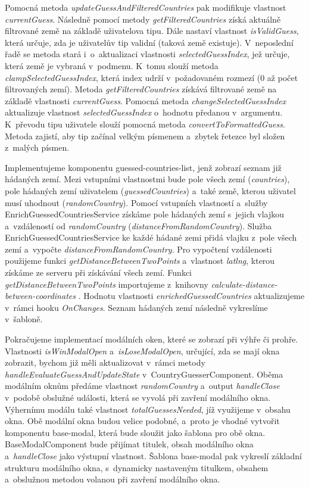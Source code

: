 Pomocná metoda \emph{updateGuessAndFilteredCountries} pak modifikuje vlastnost \emph{currentGuess}. 
Následně pomocí metody \emph{getFilteredCountries} získá aktuálně filtrované země na základě uživatelova tipu. 
Dále nastaví vlastnost \emph{isValidGuess}, která určuje, zda je uživatelův tip validní (taková země existuje). 
V~neposlední řadě se metoda stará i~o~aktualizaci vlastnosti \emph{selectedGuessIndex}, jež určuje, která země je vybraná v~podmenu. 
K~tomu slouží metoda \emph{clampSelectedGuessIndex}, která index udrží v~požadovaném rozmezí (0 až počet filtrovaných zemí).
Metoda \emph{getFilteredCountries} získává filtrované země na základě vlastnosti \emph{currentGuess}. 
Pomocná metoda \emph{changeSelectedGuessIndex} aktualizuje vlastnost \emph{selectedGuessIndex} o~hodnotu předanou v~argumentu. 
K~převodu tipu uživatele slouží pomocná metoda \emph{convertToFormattedGuess}. Metoda zajistí, aby tip začínal velkým písmenem a~zbytek řetezce byl složen z~malých písmen.

Implementujeme komponentu guessed-countries-list, jenž zobrazí seznam již hádaných zemí. 
Mezi vstupními vlastnostmi bude pole všech zemí (\emph{countries}), pole hádaných zemí uživatelem (\emph{guessedCountries}) a~také země, kterou uživatel musí uhodnout (\emph{randomCountry}).
Pomocí vstupních vlastností a~služby EnrichGuessedCountriesService získáme pole hádaných zemí s~jejich vlajkou a~vzdáleností od \emph{randomCountry} (\emph{distanceFromRandomCountry}).
Služba EnrichGuessedCountriesService ke každé hádané zemi přidá vlajku z~pole všech zemí a~vypočte \emph{distanceFromRandomCountry}. 
Pro vypočtení vzdálenosti použijeme funkci \emph{getDistanceBetweenTwoPoints} a~vlastnost \emph{latlng}, kterou získáme ze serveru při získávání všech zemí. 
Funkci \emph{getDistanceBetweenTwoPoints} importujeme z~knihovny \emph{calculate-distance-between-coordinates} \cite{distancebetweencoordinates}. 
Hodnotu vlastnosti \emph{enrichedGuessedCountries} aktualizujeme v~rámci hooku \emph{OnChanges}. Seznam hádaných zemí následně vykreslíme v~šabloně.

Pokračujeme implementací modálních oken, které se zobrazí při výhře či prohře. 
Vlastnosti \emph{isWinModalOpen} a~\emph{isLoseModalOpen}, určující, zda se mají okna zobrazit, bychom již měli aktualizovat v~rámci metody \emph{handleEvaluateGuessAndUpdateState} v~CountryGuesserComponent. 
Oběma modálním oknům předáme vlastnost \emph{randomCountry} a~output \emph{handleClose} v~podobě obslužné události, která se vyvolá při zavření modálního okna. 
Výhernímu modálu také vlastnost \emph{totalGuessesNeeded}, jíž využijeme v~obsahu okna. 
Obě modální okna budou velice podobné, a~proto je vhodné vytvořit komponentu base-modal, která bude sloužit jako šablona pro obě okna. 
BaseModalComponent bude přijímat titulek, obsah modálního okna a~\emph{handleClose} jako výstupní vlastnost. 
Šablona base-modal pak vykreslí základní strukturu modálního okna, s~dynamicky nastaveným titulkem, obsahem a~obslužnou metodou volanou při zavření modálního okna.

